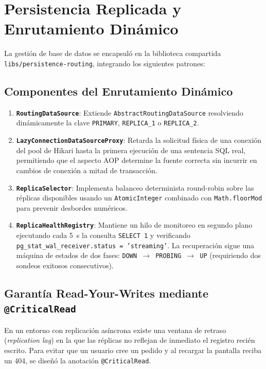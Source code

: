 \documentclass[12pt,a4paper]{article}
\begin{document}
\clearpage

\section{Persistencia Replicada y Enrutamiento Din\'{a}mico}

La gesti\'{o}n de base de datos se encapsul\'{o} en la biblioteca compartida \texttt{libs/persistence-routing}, integrando los siguientes patrones:

\subsection{Componentes del Enrutamiento Din\'{a}mico}
\begin{enumerate}
    \item \textbf{\texttt{RoutingDataSource}}: Extiende \texttt{AbstractRoutingDataSource} resolviendo din\'{a}micamente la clave \texttt{PRIMARY}, \texttt{REPLICA\_1} o \texttt{REPLICA\_2}.
    \item \textbf{\texttt{LazyConnectionDataSourceProxy}}: Retarda la solicitud f\'{i}sica de una conexi\'{o}n del pool de Hikari hasta la primera ejecuci\'{o}n de una sentencia SQL real, permitiendo que el aspecto AOP determine la fuente correcta sin incurrir en cambios de conexi\'{o}n a mitad de transacci\'{o}n.
    \item \textbf{\texttt{ReplicaSelector}}: Implementa balanceo determinista round-robin sobre las r\'{e}plicas disponibles usando un \texttt{AtomicInteger} combinado con \texttt{Math.floorMod} para prevenir desbordes num\'{e}ricos.
    \item \textbf{\texttt{ReplicaHealthRegistry}}: Mantiene un hilo de monitoreo en segundo plano ejecutando cada 5~s la consulta \texttt{SELECT 1} y verificando \texttt{pg\_stat\_wal\_receiver.status = 'streaming'}. La recuperaci\'{o}n sigue una m\'{a}quina de estados de dos fases: \texttt{DOWN $\rightarrow$ PROBING $\rightarrow$ UP} (requiriendo dos sondeos exitosos consecutivos).
\end{enumerate}

\subsection{Garant\'{i}a Read-Your-Writes mediante \texttt{@CriticalRead}}
En un entorno con replicaci\'{o}n as\'{i}ncrona existe una ventana de retraso (\textit{replication lag}) en la que las r\'{e}plicas no reflejan de inmediato el registro reci\'{e}n escrito. Para evitar que un usuario cree un pedido y al recargar la pantalla reciba un 404, se dise\~{n}\'{o} la anotaci\'{o}n \texttt{@CriticalRead}.
\end{document}
